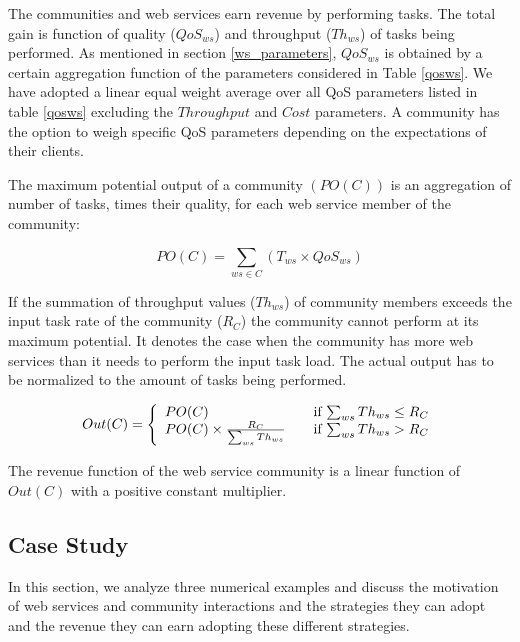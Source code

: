 \documentclass[10pt,journal,cspaper,compsoc]{IEEEtran}
\begin{document}
The communities and web services earn revenue by performing tasks. The total gain is function of quality ($QoS_{ws}$) and throughput ($Th_{ws}$) of tasks being performed. As mentioned in section \ref{ws_parameters}, $QoS_{ws}$ is obtained by a certain aggregation function of the parameters considered in Table \ref{qosws}. We have adopted a linear equal weight average over all QoS parameters listed in table \ref{qosws} excluding the $Throughput$ and $Cost$ parameters. A community has the option to weigh specific QoS parameters depending on the expectations of their clients.

The maximum potential output of a community $(PO(C))$  is an aggregation of number of tasks, times their quality, for each web service member of the community:

\begin{equation}
PO(C) = \sum_{ws \in C}{(T_{ws} \times QoS_{ws})}
\end{equation}

If the summation of throughput values ($Th_{ws}$) of community members exceeds the input task rate of the community ($R_C$) the community cannot perform at its maximum potential. It denotes the case when the community has more web services than it needs to perform the input task load. The actual output has to be normalized to the amount of tasks being performed.

\begin{equation}\label{out_c}
Out(C) = \left\{
  \begin{array}{l l}
    PO(C) & \quad \text{if $\sum_{ws}{Th_{ws}} \leq R_{C}$}\\
    PO(C) \times \frac{R_{C}}{\sum_{ws}{Th_{ws}}} & \quad \text{if $\sum_{ws}{Th_{ws}} > R_{C}$}
  \end{array} \right.
\end{equation}

The revenue function of the web service community is a linear function of $Out(C)$ with a positive constant multiplier.

\subsection{Case Study}

In this section, we analyze three numerical examples and discuss the motivation of web services and community interactions and the strategies they can adopt and the revenue they can earn adopting these different strategies.
\end{document}
